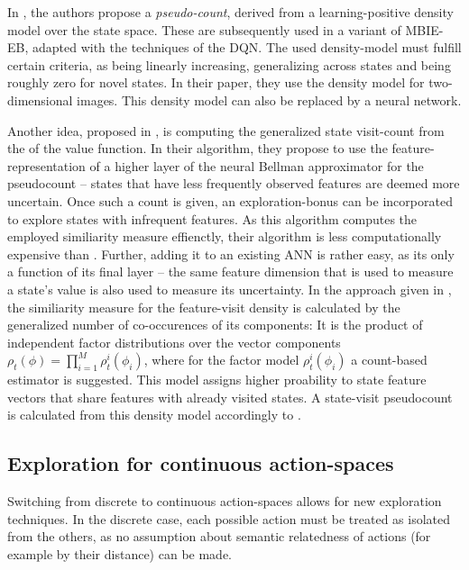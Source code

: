 In \cite{bellemare_unifying_2016}, the authors propose a \textit{pseudo-count}, derived from a learning-positive density model over the state space. These are subsequently used in a variant of MBIE-EB, adapted with the techniques of the DQN. The used density-model must fulfill certain criteria, as being linearly increasing, generalizing across states and being roughly zero for novel states. In their paper, they use the  density model for two-dimensional images. This density model can also be replaced by a neural network.

Another idea, proposed in \cite{martin_count-based_2017}, is computing the generalized state visit-count from the  of the value function. In their algorithm, they propose to use the feature-representation of a higher layer of the neural Bellman approximator for the pseudocount -- states that have less frequently observed features are deemed more uncertain. Once such a count is given, an exploration-bonus can be incorporated to explore states with infrequent features. As this algorithm computes the employed similiarity measure effienctly, their algorithm is less computationally expensive than \cite{bellemare_unifying_2016}. Further, adding it to an existing ANN is rather easy, as its only a function of its final layer -- the same feature dimension that is used to measure a state's value is also used to measure its uncertainty. In the approach given in \cite{martin_count-based_2017}, the similiarity measure for the feature-visit density is calculated by the generalized number of co-occurences of its components: It is the product of independent factor distributions over the vector components $\rho_t(\phi) = \prod_{i=1}^{M}\rho_t^i(\phi_i)$, where for the factor model $\rho_t^i(\phi_i)$ a count-based estimator is suggested. This model assigns higher proability to state feature vectors that share features with already visited states. A state-visit pseudocount is calculated from this density model accordingly to \cite{bellemare_unifying_2016}. 


\subsection{Exploration for continuous action-spaces}

\label{sec:contexptheory}

Switching from discrete to continuous action-spaces allows for new exploration techniques. In the discrete case, each possible action must be treated as isolated from the others, as no assumption about semantic relatedness of actions (for example by their distance) can be made. 

